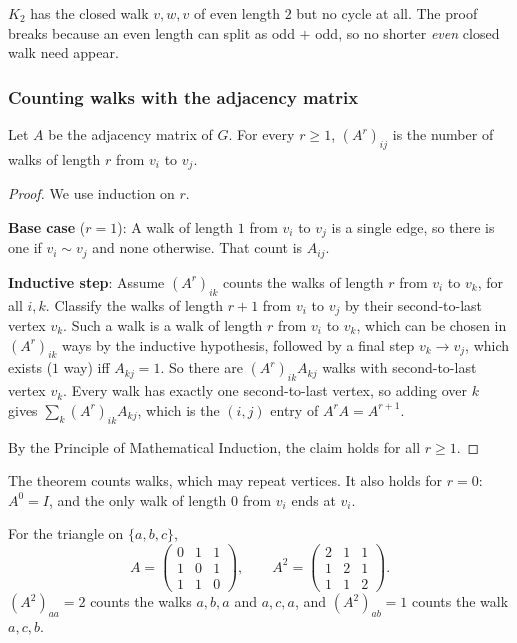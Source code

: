 \begin{note}
$K_2$ has the closed walk $v,w,v$ of even length $2$ but no cycle at all. The proof breaks because an even length can split as odd $+$ odd, so no shorter \emph{even} closed walk need appear.
\end{note}

\subsubsection*{Counting walks with the adjacency matrix}

\begin{theorem}
\label{thm:walks}
Let $A$ be the adjacency matrix of $G$. For every $r\ge1$, $(A^r)_{ij}$ is the number of walks of length $r$ from $v_i$ to $v_j$.
\end{theorem}
\begin{proof}
We use induction on $r$.

\textbf{Base case} ($r=1$): A walk of length $1$ from $v_i$ to $v_j$ is a single edge, so there is one if $v_i\sim v_j$ and none otherwise. That count is $A_{ij}$.

\textbf{Inductive step}: Assume $(A^r)_{ik}$ counts the walks of length $r$ from $v_i$ to $v_k$, for all $i,k$. Classify the walks of length $r+1$ from $v_i$ to $v_j$ by their second-to-last vertex $v_k$. Such a walk is a walk of length $r$ from $v_i$ to $v_k$, which can be chosen in $(A^r)_{ik}$ ways by the inductive hypothesis, followed by a final step $v_k\to v_j$, which exists ($1$ way) iff $A_{kj}=1$. So there are $(A^r)_{ik}A_{kj}$ walks with second-to-last vertex $v_k$. Every walk has exactly one second-to-last vertex, so adding over $k$ gives $\sum_{k}(A^r)_{ik}A_{kj}$, which is the $(i,j)$ entry of $A^rA=A^{r+1}$.

By the Principle of Mathematical Induction, the claim holds for all $r\ge1$.
\end{proof}

\begin{note}
The theorem counts walks, which may repeat vertices. It also holds for $r=0$: $A^0=I$, and the only walk of length $0$ from $v_i$ ends at $v_i$.
\end{note}

\begin{example}
For the triangle on $\{a,b,c\}$,
\[
A=\begin{pmatrix}0&1&1\\1&0&1\\1&1&0\end{pmatrix},\qquad
A^2=\begin{pmatrix}2&1&1\\1&2&1\\1&1&2\end{pmatrix}.
\]
$(A^2)_{aa}=2$ counts the walks $a,b,a$ and $a,c,a$, and $(A^2)_{ab}=1$ counts the walk $a,c,b$.
\end{example}


